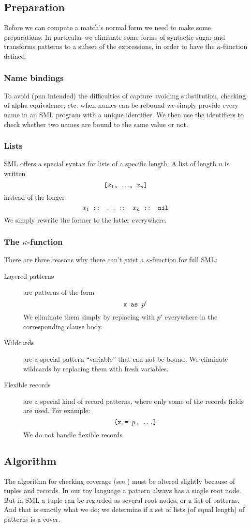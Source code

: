 \subsection{Preparation}\label{sec:preparation}
Before we can compute a match's normal form we need to make some
preparations. In particular we eliminate some forms of syntactic sugar and
transforms patterns to a subset of the expressions, in order to have the
$\kappa$-function defined.

\subsubsection{Name bindings}
To avoid (pun intended) the difficulties of capture avoiding substitution, checking
of alpha equivalence, etc. when names can be rebound we simply provide every
name in an SML program with a unique identifier. We then use the identifiers to
check whether two names are bound to the same value or not.

\subsubsection{Lists}
SML offers a special syntax for lists of a specific length. A list of length $n$
is written
\[
\texttt{[$x_1$, $\ldots$, $x_n$]}
\]
instead of the longer
\[
\texttt{$x_1$ :: $\ldots$ :: $x_n$ :: nil}
\]
We simply rewrite the former to the latter everywhere.

\subsubsection{The $\kappa$-function}
There are three reasons why there can't exist a $\kappa$-function for full SML:
\begin{description}
\item[Layered patterns] are patterns of the form
  \[
  \texttt{x as $p'$}
  \]
  We eliminate them simply by replacing  with $p'$ everywhere in the
  corresponding clause body.
\item[Wildcards] are a special pattern ``variable'' that can not be bound. We
  eliminate wildcards by replacing them with fresh variables.
\item[Flexible records] are a special kind of record patterns, where only some of
  the records fields are used. For example:
  \[
  \texttt{\{x = $p$, ...\}}
  \]
  We do not handle flexible records.
\end{description}

\subsection{Algorithm}\label{sec:algorithm}
The algorithm for checking coverage (see ) must be altered
slightly because of tuples and records. In our toy language a pattern always has
a single root node. But in SML a tuple can be regarded as several root nodes, or
a list of patterns. And that is exactly what we do; we determine if a set of
lists (of equal length) of patterns is a cover.

